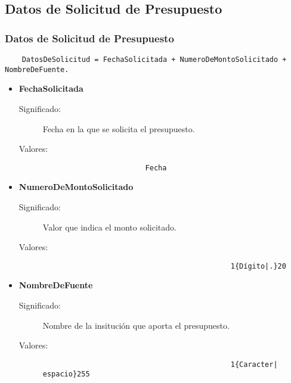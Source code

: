 \subsection{Datos de Solicitud de Presupuesto}
\label{dd:DEPresupuestos}
\subsubsection{Datos de Solicitud de Presupuesto}
\begin{lstlisting}
	DatosDeSolicitud = FechaSolicitada + NumeroDeMontoSolicitado + NombreDeFuente.
\end{lstlisting}
\begin{itemize}

        \item \textbf{FechaSolicitada}
		\begin{description}
			\item [Significado:] Fecha en la que se solicita el presupuesto.
			\item [Valores:]{ \begin{lstlisting} 
						Fecha 
                                         \end{lstlisting}} 
		\end{description}

        \item \textbf{NumeroDeMontoSolicitado}
		\begin{description}
			\item [Significado:] Valor que indica el monto solicitado.
			\item [Valores:]{\begin{lstlisting}
                                            1{Dígito|.}20
                                         \end{lstlisting}} 
		\end{description}
	\item \textbf{NombreDeFuente}
		\begin{description}
			\item [Significado:] Nombre de la insitución que aporta el presupuesto.
			\item [Valores:]{\begin{lstlisting}
                                            1{Caracter| espacio}255
                                         \end{lstlisting}} 
		\end{description}       

\end{itemize}

